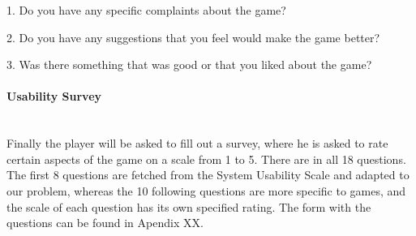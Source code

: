 1. Do you have any specific complaints about the game?

2. Do you have any suggestions that you feel would make the game better?

3. Was there something that was good or that you liked about the game?

\paragraph{Usability Survey}\mbox{}\\

Finally the player will be asked to fill out a survey, where he is asked to rate certain aspects of the game on a scale from 1 to 5. There are in all 18 questions. The first 8 questions are fetched from the System Usability Scale and adapted to our problem, whereas the 10 following questions are more specific to games, and the scale of each question has its own specified rating. The form with the questions can be found in Apendix XX.

